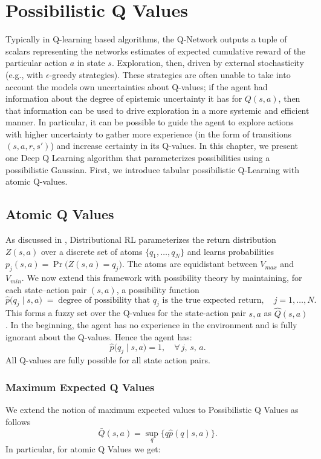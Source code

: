\documentclass[11pt,a4paper]{report}
\begin{document}
\chapter{Possibilistic Q Values} 
\label{chapter:pqv}
Typically in Q-learning based algorithms, the Q-Network outputs a tuple of scalars representing the networks estimates of expected cumulative reward of the particular action $a$ in state $s$. Exploration, then, driven by external stochasticity (e.g., with $\epsilon$-greedy strategies). These strategies are often unable to take into account the models own uncertainties about Q-values; if the agent had information about the degree of epistemic uncertainty it has for $Q(s,a)$, then that information can be used to drive exploration in a more systemic and efficient manner. In particular, it can be possible to guide the agent to explore actions with higher uncertainty to gather more experience (in the form of transitions $(s, a, r, s')$) and increase certainty in its Q-values. In this chapter, we present one Deep Q Learning algorithm that parameterizes possibilities using a possibilistic Gaussian. First, we introduce tabular possibilistic Q-Learning with atomic Q-values. 

\section{Atomic Q Values} \label{sec:atomicQpos}
As discussed in \cite{bellemare2017}, Distributional RL parameterizes the return distribution $Z(s,a)$ over a discrete set of atoms $\{q_1, \dots, q_N\}$ and learns probabilities $p_j(s,a) = \Pr\bigl(Z(s,a)=q_j\bigr)$. The atoms are equidistant between $V_{max}$ and $V_{min}$. We now extend this framework with possibility theory by maintaining, for each state–action pair $(s,a)$, a possibility function
\[
  \hat{p}\bigl(q_j \mid s,a\bigr) \;=\; \text{degree of possibility that }q_j\text{ is the true expected return},
  \quad j=1,\dots,N.
\]
This forms a fuzzy set over the Q-values for the state-action pair $s,a$ as $\hat{Q}(s,a)$. 
In the beginning, the agent has no experience in the environment and is fully ignorant about the Q-values. Hence the agent has:
\[
  \hat{p}\bigl(q_j \mid s,a\bigr) = 1,
  \quad \forall\,j,\,s,\,a.
\]
All Q-values are fully possible for all state action pairs. 

\subsection{Maximum Expected Q Values}
We extend the notion of maximum expected values to  Possibilistic Q Values as follows
\[ \bar{Q}(s,a)= \sup_{q}\{q \hat{p}(q \mid s, a)\}. \]
In particular, for atomic Q Values we get:
\end{document}
